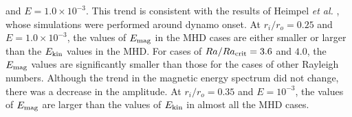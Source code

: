 {\color{blue}  %
and $E = 1.0 \times 10^{-3}$.
}
This trend is consistent with the results of Heimpel {\it et al.} , whose simulations were performed around dynamo onset. 
At $r_i/r_o = 0.25$ and $E = 1.0 \times 10^{-3}$, the values of $E_{\rm mag}$ in the MHD cases are either smaller or larger than the $E_{\rm kin}$ values in the MHD.
For cases of $Ra/Ra_{\rm crit}  = 3.6$ and $4.0$, the $E_{\rm mag}$ values are significantly smaller than those for the cases of other Rayleigh numbers.
Although the trend in the magnetic energy spectrum did not change, there was a decrease in the amplitude.
{\color{blue} At $r_i/r_o = 0.35$ and $E = 10^{-3}$, 
}
{\color{red}
the values of $E_{\rm mag}$ are larger than the values of $E_{\rm kin}$ in almost all the MHD cases.
}

